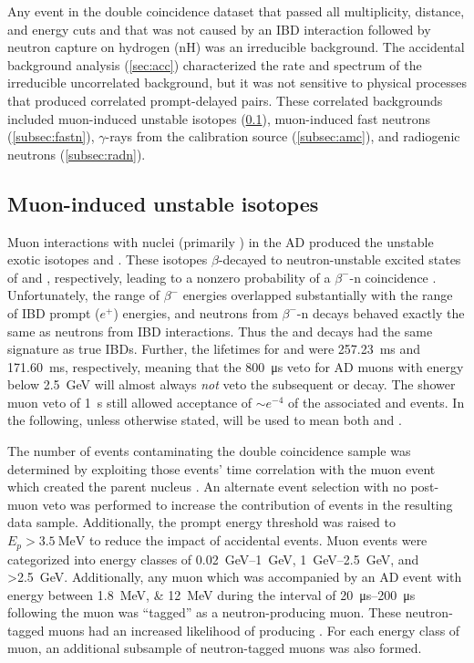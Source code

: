 Any event in the double coincidence dataset
that passed all multiplicity, distance, and energy cuts
and that was not caused by an IBD interaction followed by
neutron capture on hydrogen (nH)
was an irreducible background.
The accidental background analysis (\cref{sec:acc})
characterized the rate and spectrum of
the irreducible uncorrelated background,
but it was not sensitive to physical processes that produced
correlated prompt-delayed pairs.
These correlated backgrounds included muon-induced unstable isotopes (\cref{subsec:li9}),
muon-induced fast neutrons (\cref{subsec:fastn}),
$\gamma$-rays from the \amc{} calibration source (\cref{subsec:amc}),
and radiogenic neutrons (\cref{subsec:radn}).

\subsection{Muon-induced unstable isotopes}
\label{subsec:li9}

Muon interactions with nuclei (primarily ) in the AD
produced the unstable exotic isotopes \li{} and \he{}.
These isotopes $\beta$-decayed to neutron-unstable excited states
of  and , respectively,
leading to a nonzero probability of a $\beta^{-}$-n coincidence \cite{kamland_li9}.
Unfortunately, the range of $\beta^-$ energies overlapped substantially
with the range of IBD prompt ($e^+$) energies,
and neutrons from $\beta^-$-n decays behaved
exactly the same as neutrons from IBD interactions.
Thus the \li{} and \he{} decays had the same signature as true IBDs.
Further, the lifetimes for \li{} and \he{} were
\SI{257.23}{\ms} and \SI{171.60}{\ms}, respectively,
meaning that the \SI{800}{\us} veto for AD muons
with energy below \SI{2.5}{\GeV} will almost always
\emph{not} veto the subsequent \li{} or \he{} decay.
The shower muon veto of \SI{1}{\s} still allowed acceptance of
$\sim e^{-4}$ of the associated \li{} and \he{} events.
In the following, unless otherwise stated,
\li{} will be used to mean both \li{} and \he{}.

The number of \li{} events contaminating the double coincidence sample
was determined by exploiting those events' time correlation
with the muon event which created the parent \li{} nucleus \cite{jinjing_2020may}.
An alternate event selection with no post-muon veto
was performed to increase the contribution of \li{} events
in the resulting data sample.
Additionally, the prompt energy threshold
was raised to $E_p > \SI{3.5}{\MeV}$
to reduce the impact of accidental events.
Muon events were categorized into energy classes
of \SIrange{0.02}{1}{\GeV}, \SIrange{1}{2.5}{\GeV},
and \SI{>2.5}{\GeV}.
Additionally, any muon which was accompanied by
an AD event with energy between \SIlist{1.8;12}{\MeV}
during the interval of \SIrange{20}{200}{\us} following the muon
was ``tagged'' as a neutron-producing muon.
These neutron-tagged muons had an increased likelihood
of producing \li{}.
For each energy class of muon,
an additional subsample of neutron-tagged muons was also formed.

